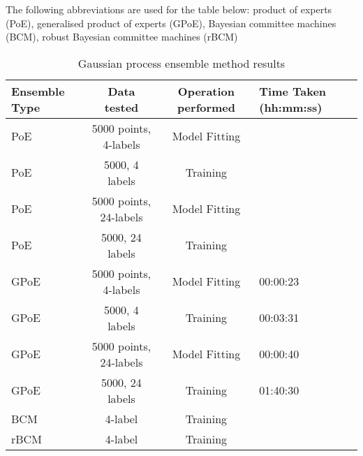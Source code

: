 The following abbreviations are used for the table below: product of experts (PoE), generalised product of experts (GPoE), Bayesian committee machines (BCM), robust Bayesian committee machines (rBCM)
\begin{table}[H]
    \centering
    \begin{tabular}{|C{3cm}|c|c|C{3cm}|}
        \hline
        Ensemble Type & Data tested & Operation performed & Time Taken (hh:mm:ss) \\\hline
        PoE & 5000 points, 4-labels & Model Fitting & \\
        PoE & 5000, 4 labels & Training & \\
        PoE & 5000 points, 24-labels & Model Fitting &  \\
        PoE & 5000, 24 labels & Training & \\
        GPoE  & 5000 points, 4-labels & Model Fitting & 00:00:23 \\
        GPoE  & 5000, 4 labels & Training & 00:03:31 \\
        GPoE  & 5000 points, 24-labels & Model Fitting & 00:00:40 \\
        GPoE  & 5000, 24 labels & Training & 01:40:30 \\
        BCM  & 4-label & Training & \\
        rBCM & 4-label & Training & \\
        \hline
    \end{tabular}
    \label{table:gpensemble-results}
    \caption{Gaussian process ensemble method results}
\end{table}
